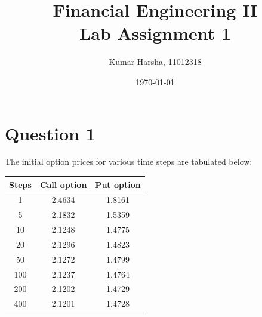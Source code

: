 \documentclass[12pt]{article}
\begin{document}
\title{Financial Engineering II\\Lab Assignment 1}
\author{Kumar Harsha, 11012318}
\date{\today}
\maketitle
\tableofcontents
\newpage
\section{Question 1}
The initial option prices for various time steps are tabulated below:\\
  \begin{center}
  \begin{tabular}{c|c|c}
      Steps &Call option &Put option\\ \hline \hline
      1 &2.4634 &1.8161\\ \hline
      5 &2.1832 &1.5359\\ \hline
      10 &2.1248 &1.4775\\ \hline
      20 &2.1296 &1.4823\\ \hline
      50 &2.1272 &1.4799\\ \hline
      100 &2.1237 &1.4764\\ \hline
      200 &2.1202 &1.4729\\ \hline
      400 &2.1201 &1.4728\\ \hline
  \end{tabular}
  \end{center}
\end{document}
